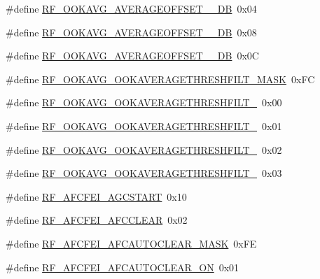 \begin{DoxyCompactItemize}
\item 
\#define \mbox{\hyperlink{sx1276_regs-_fsk_8h_a1bcf452b92ad86f1bf5d1876bf3764cf}{R\+F\+\_\+\+O\+O\+K\+A\+V\+G\+\_\+\+A\+V\+E\+R\+A\+G\+E\+O\+F\+F\+S\+E\+T\+\_\+\_\+\+DB}}~0x04
\item 
\#define \mbox{\hyperlink{sx1276_regs-_fsk_8h_a0ad417387089ff60df572ff0caea31e3}{R\+F\+\_\+\+O\+O\+K\+A\+V\+G\+\_\+\+A\+V\+E\+R\+A\+G\+E\+O\+F\+F\+S\+E\+T\+\_\+\_\+\+DB}}~0x08
\item 
\#define \mbox{\hyperlink{sx1276_regs-_fsk_8h_a01d49f7bf297e19573e597c1cea201b3}{R\+F\+\_\+\+O\+O\+K\+A\+V\+G\+\_\+\+A\+V\+E\+R\+A\+G\+E\+O\+F\+F\+S\+E\+T\+\_\+\_\+\+DB}}~0x0C
\item 
\#define \mbox{\hyperlink{sx1276_regs-_fsk_8h_a7692c2da6c19d0727a2514eb98b7084d}{R\+F\+\_\+\+O\+O\+K\+A\+V\+G\+\_\+\+O\+O\+K\+A\+V\+E\+R\+A\+G\+E\+T\+H\+R\+E\+S\+H\+F\+I\+L\+T\+\_\+\+M\+A\+SK}}~0x\+FC
\item 
\#define \mbox{\hyperlink{sx1276_regs-_fsk_8h_af32acaba93e5219170d91aa2f860f6f8}{R\+F\+\_\+\+O\+O\+K\+A\+V\+G\+\_\+\+O\+O\+K\+A\+V\+E\+R\+A\+G\+E\+T\+H\+R\+E\+S\+H\+F\+I\+L\+T\+\_}}~0x00
\item 
\#define \mbox{\hyperlink{sx1276_regs-_fsk_8h_af101871f4380dea2544b985a7d162347}{R\+F\+\_\+\+O\+O\+K\+A\+V\+G\+\_\+\+O\+O\+K\+A\+V\+E\+R\+A\+G\+E\+T\+H\+R\+E\+S\+H\+F\+I\+L\+T\+\_}}~0x01
\item 
\#define \mbox{\hyperlink{sx1276_regs-_fsk_8h_a33d6a5bc732f2f47f9f45b93c2d6b4a8}{R\+F\+\_\+\+O\+O\+K\+A\+V\+G\+\_\+\+O\+O\+K\+A\+V\+E\+R\+A\+G\+E\+T\+H\+R\+E\+S\+H\+F\+I\+L\+T\+\_}}~0x02
\item 
\#define \mbox{\hyperlink{sx1276_regs-_fsk_8h_a5f946cb672cf2b677e28758a94ce65dd}{R\+F\+\_\+\+O\+O\+K\+A\+V\+G\+\_\+\+O\+O\+K\+A\+V\+E\+R\+A\+G\+E\+T\+H\+R\+E\+S\+H\+F\+I\+L\+T\+\_}}~0x03
\item 
\#define \mbox{\hyperlink{sx1276_regs-_fsk_8h_a99a17d7febe804164dd9aabe561ca38b}{R\+F\+\_\+\+A\+F\+C\+F\+E\+I\+\_\+\+A\+G\+C\+S\+T\+A\+RT}}~0x10
\item 
\#define \mbox{\hyperlink{sx1276_regs-_fsk_8h_a30d3f06563697b523ac9d05ae193f40d}{R\+F\+\_\+\+A\+F\+C\+F\+E\+I\+\_\+\+A\+F\+C\+C\+L\+E\+AR}}~0x02
\item 
\#define \mbox{\hyperlink{sx1276_regs-_fsk_8h_a29c1ef8bc89fbd62f2ee2fe4fd84c4c2}{R\+F\+\_\+\+A\+F\+C\+F\+E\+I\+\_\+\+A\+F\+C\+A\+U\+T\+O\+C\+L\+E\+A\+R\+\_\+\+M\+A\+SK}}~0x\+FE
\item 
\#define \mbox{\hyperlink{sx1276_regs-_fsk_8h_a6b142333d65dd99ae62b3b1b4468d192}{R\+F\+\_\+\+A\+F\+C\+F\+E\+I\+\_\+\+A\+F\+C\+A\+U\+T\+O\+C\+L\+E\+A\+R\+\_\+\+ON}}~0x01

\end{DoxyCompactItemize}
